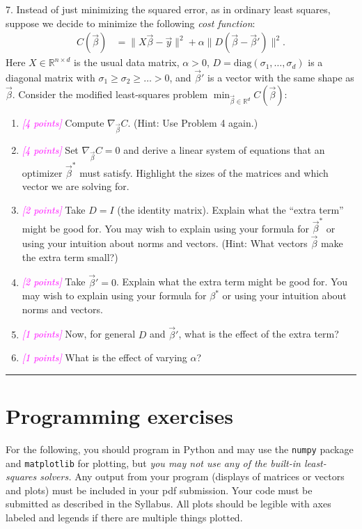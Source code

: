 \documentclass{article}
\newcommand{\R}{\mathbb{R}} %
\newcommand{\points}[1]{\small\textcolor{magenta}{\emph{[#1 points]}} \normalsize}
\begin{document}
\vspace{1em}
7. Instead of just minimizing the squared error, as in ordinary least squares, suppose we decide
to minimize the following {\em cost function}:
\begin{align*}
  C(\vec \beta) &= \| X \vec \beta - \vec y \|^2 + \alpha \| D(\vec \beta - \vec \beta') \|^2.
\end{align*}
Here $X \in \R^{n \times d}$ is the usual data matrix, 
$\alpha > 0$, $D = \mathrm{diag}(\sigma_1, \ldots, \sigma_d)$ 
is a diagonal matrix with $\sigma_1 \geq \sigma_2 \geq \ldots > 0$, 
and $\vec \beta'$ is a vector with the same shape as $\vec \beta$.
Consider the modified least-squares problem
$
\min_{\vec \beta \in \R^d} C(\vec \beta):
$
\begin{enumerate}
\item \points{4} Compute $\nabla_{\vec \beta} C$. (Hint: Use Problem 4 again.)
\item \points{4} Set $\nabla_{\vec \beta} C = 0$ and derive a linear system of equations
  that an optimizer $\vec \beta^*$ must satisfy. 
  Highlight the sizes of the matrices and which vector we are solving for.
\item \points{2} Take $D = I$ (the identity matrix). 
  Explain what the ``extra term'' might be good for.
  You may wish to explain using your formula for $\vec \beta^*$ or using your intuition about norms and vectors.
  (Hint: What vectors $\vec \beta$ make the extra term small?)
\item \points{2} Take $\vec \beta' = 0$.   Explain what the extra term might be good for.
  You may wish to explain using your formula for $\beta^*$ or using your intuition about norms and vectors.
\item \points{1} Now, for general $D$ and $\vec \beta'$, what is the effect of the extra term?
\item \points{1} What is the effect of varying $\alpha$?
\end{enumerate}

\begin{center}
\rule{.5\linewidth}{1pt}
\end{center}

\section*{Programming exercises}

For the following, you should program in Python and may use the
{\tt numpy} package and {\tt matplotlib} for plotting, 
but {\em you may not use any of the built-in least-squares solvers.}
Any output from your program (displays of matrices or vectors and plots) 
must be included in your pdf submission.
Your code must be submitted as described in the Syllabus.
All plots should be legible with axes labeled and legends if there are multiple things plotted.
\end{document}
